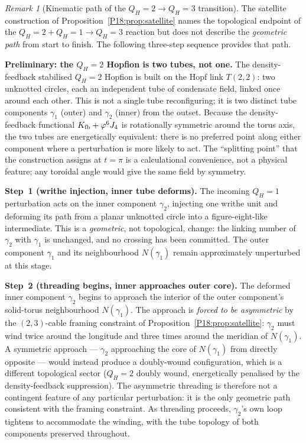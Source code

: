 \documentclass[11pt,a4paper]{article}
\theoremstyle{definition}\newtheorem{definition}[theorem]{Definition}
\theoremstyle{remark}
\newtheorem{remark}[theorem]{Remark}
\newcommand{\vp}{\varphi}
\newcommand{\QH}{Q_H}
\begin{document}
\begin{remark}[Kinematic path of the $\QH=2\to\QH=3$ transition]
\label{P18:rem:crossing_path}
The satellite construction of Proposition~\ref{P18:prop:satellite} names
the topological endpoint of the $\QH=2+\QH=1\to\QH=3$ reaction but
does not describe the \emph{geometric path} from start to finish.
The following three-step sequence provides that path.

\textbf{Preliminary: the $\QH=2$ Hopfion is two tubes, not one.}
The density-feedback stabilised $\QH=2$ Hopfion is built on the
Hopf link $T(2,2)$: two unknotted circles, each an independent tube
of condensate field, linked once around each other.  This is not a
single tube reconfiguring; it is two distinct tube components
$\gamma_1$ (outer) and $\gamma_2$ (inner) from the outset.  Because
the density-feedback functional $K_{\rm fb}+\vp^6 J_4$ is
rotationally symmetric around the torus axis, the two tubes are
energetically equivalent: there is no preferred point along either
component where a perturbation is more likely to act.  The
``splitting point'' that the construction assigns at $t=\pi$ is a
calculational convenience, not a physical feature; any toroidal
angle would give the same field by symmetry.

\textbf{Step~1 (writhe injection, inner tube deforms).}  The
incoming $\QH=1$ perturbation acts on the inner component $\gamma_2$,
injecting one writhe unit and deforming its path from a planar
unknotted circle into a figure-eight-like intermediate.  This is a
\emph{geometric}, not topological, change: the linking number of
$\gamma_2$ with $\gamma_1$ is unchanged, and no crossing has been
committed.  The outer component $\gamma_1$ and its neighbourhood
$N(\gamma_1)$ remain approximately unperturbed at this stage.

\textbf{Step~2 (threading begins, inner approaches outer core).}
The deformed inner component $\gamma_2$ begins to approach the
interior of the outer component's solid-torus neighbourhood
$N(\gamma_1)$.  The approach is \emph{forced to be asymmetric}
by the $(2,3)$-cable framing constraint of
Proposition~\ref{P18:prop:satellite}: $\gamma_2$ must wind twice around
the longitude and three times around the meridian of $N(\gamma_1)$.
A symmetric approach --- $\gamma_2$ approaching the core of
$N(\gamma_1)$ from directly opposite --- would instead produce a
doubly-wound configuration, which is a different topological sector
($\QH=2$ doubly wound, energetically penalised by the
density-feedback suppression).  The asymmetric threading is
therefore not a contingent feature of any particular perturbation:
it is the only geometric path consistent with the framing
constraint.  As threading proceeds, $\gamma_2$'s own loop tightens
to accommodate the winding, with the tube topology of both
components preserved throughout.


\end{remark}
\end{document}
